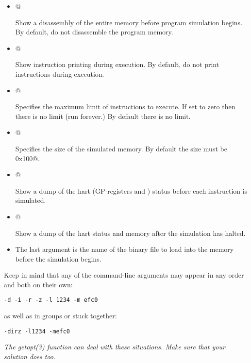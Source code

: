 \documentclass{article}
\begin{document}
\begin{itemize}
\item \verb@[-d]@

	Show a disassembly of the entire memory before program simulation begins.  
	By default, do not disassemble the program memory.

\item \verb@[-i]@

	Show instruction printing during execution.
	By default, do not print instructions during execution.

\item {}@

	Specifies the maximum limit of instructions to execute.  If set to zero
	then there is no limit (run forever.) By default there is no limit.

\item {}@

	Specifies the size of the simulated memory.  By default the size must
	be \verb@0x100@.

\item \verb@[-r]@

	Show a dump of the hart (GP-registers and \verb@pc@) status before 
	each instruction is simulated.

\item \verb@[-z]@

	Show a dump of the hart status and memory after the simulation has halted.

\item The last argument is the name of the binary file to load into the memory 
before the simulation begins.

\end{itemize}

Keep in mind that any of the command-line arguments may appear in any order and
both on their own:

{\footnotesize
\begin{verbatim}
-d -i -r -z -l 1234 -m efc0
\end{verbatim}
}

as well as in groups or stuck together:

{\footnotesize
\begin{verbatim}
-dirz -l1234 -mefc0
\end{verbatim}
}

{\em The getopt(3) function can deal with these situations.  Make sure that your 
solution does too}.
\end{document}
